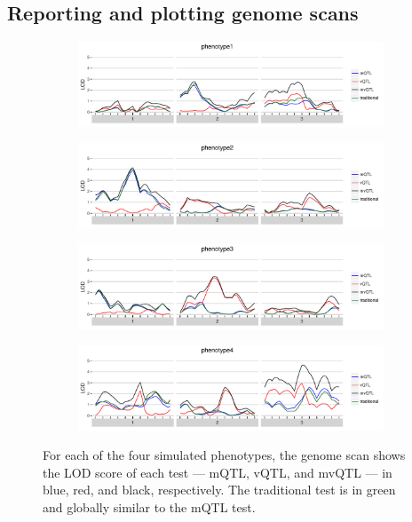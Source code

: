 \documentclass[9pt,twocolumn,twoside]{gsag3jnl}
\begin{document}
\subsection*{Reporting and plotting genome scans}

\begin{figure}[t]
    \begin{subfigure}[b]{\linewidth}
        \includegraphics[width=\textwidth]{images/LOD_scan_phenotype1.pdf}
    \end{subfigure}
    \begin{subfigure}[b]{\linewidth}
        \includegraphics[width=\textwidth]{images/LOD_scan_phenotype2.pdf}
    \end{subfigure}
    \begin{subfigure}[b]{\linewidth}
        \includegraphics[width=\textwidth]{images/LOD_scan_phenotype3.pdf}
    \end{subfigure}
    \begin{subfigure}[b]{\linewidth}
        \includegraphics[width=\textwidth]{images/LOD_scan_phenotype4.pdf}
    \end{subfigure}
    \caption{
        For each of the four simulated phenotypes, the genome scan shows the LOD score of each test --- mQTL, vQTL, and mvQTL --- in blue, red, and black, respectively.
        The traditional test is in green and globally similar to the mQTL test.
    }
    \label{fig:lod_score_scans}
\end{figure}
\end{document}
